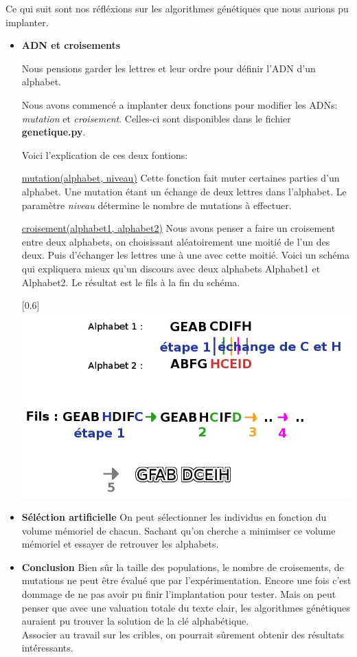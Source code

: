 \documentclass[a4paper, 11pt]{article}
\begin{document}
Ce qui suit sont nos réfléxions sur les algorithmes génétiques que nous aurions
pu implanter.\\
\begin{itemize}
\item \textbf{ADN et croisements}

Nous pensions garder les lettres et leur ordre pour définir l'ADN d'un alphabet.

Nous avons commencé a implanter deux fonctions pour modifier les ADNs: \textit{mutation} et \textit{croisement}.
Celles-ci sont disponibles dans le fichier \textbf{genetique.py}.

Voici l'explication de ces deux fontions:

\underline{mutation(alphabet, niveau)}
Cette fonction fait muter certaines parties d'un alphabet. Une
mutation étant un échange de deux lettres dans l'alphabet. Le paramètre
\textit{niveau} détermine le nombre de mutations à effectuer.

\underline{croisement(alphabet1, alphabet2)}
Nous avons penser a faire un croisement entre deux alphabets, on
choisissant aléatoirement une moitié de l'un des deux. Puis d'échanger
les lettres une à une avec cette moitié. Voici un schéma qui
expliquera mieux qu'un discours avec deux alphabets Alphabet1 et
Alphabet2. Le résultat est le fils à la fin du schéma.
 
\begin{center}
 \scalebox{0.6}[0.6]{\includegraphics{./croisement.jpg}}
\end{center}


\item \textbf{Séléction artificielle}
On peut sélectionner les individus en fonction du volume mémoriel de
chacun. Sachant qu'on cherche a minimiser ce volume mémoriel et
essayer de retrouver les alphabets.

\item \textbf{Conclusion}
Bien sûr la taille des populations, le nombre de croisements, de
mutations ne peut être évalué que par l'expérimentation. Encore une
fois c'est dommage de ne pas avoir pu finir l'implantation pour
tester. Mais on peut penser que avec une valuation totale du texte
clair, les algorithmes génétiques auraient pu trouver la solution de
la clé alphabétique. \\

Associer au travail sur les cribles, on pourrait sûrement
obtenir des résultats intéressants.

\end{itemize}
\end{document}
